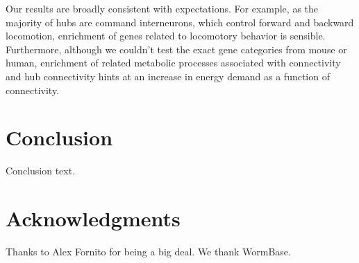\documentclass[10pt,letterpaper]{article}
\begin{document}
Our results are broadly consistent with expectations.
For example, as the majority of hubs are command interneurons, which control forward and backward locomotion, enrichment of genes related to locomotory behavior is sensible.
Furthermore, although we couldn't test the exact gene categories from mouse or human, enrichment of related metabolic processes associated with connectivity and hub connectivity hints at an increase in energy demand as a function of connectivity.

\section*{Conclusion}

Conclusion text.

\section*{Acknowledgments}
Thanks to Alex Fornito for being a big deal.
We thank WormBase.

\nolinenumbers

%
%
%




\end{document}
